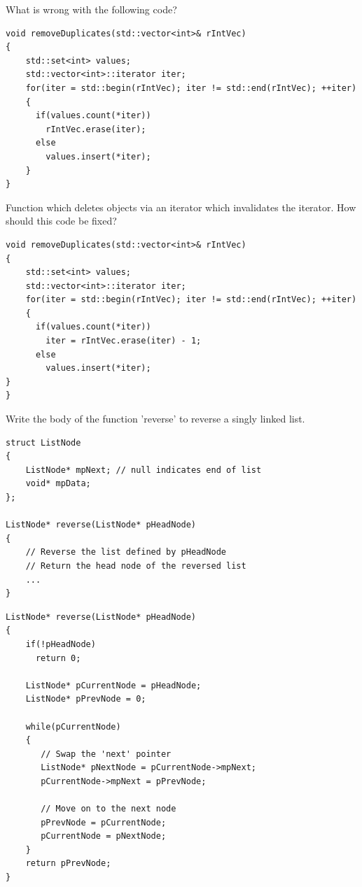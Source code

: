 \documentclass{exam}%
\begin{document}
\begin{questions}
\question What is wrong with the following code?
\begin{lstlisting}
void removeDuplicates(std::vector<int>& rIntVec)
{
    std::set<int> values;
    std::vector<int>::iterator iter;
    for(iter = std::begin(rIntVec); iter != std::end(rIntVec); ++iter)
    {
      if(values.count(*iter))
        rIntVec.erase(iter);
      else
        values.insert(*iter);
    }
}
\end{lstlisting}
\begin{solution}[.2in]
Function which deletes objects via an iterator which invalidates the iterator. How should this code be fixed?
\begin{lstlisting}
void removeDuplicates(std::vector<int>& rIntVec)
{
    std::set<int> values;
    std::vector<int>::iterator iter;
    for(iter = std::begin(rIntVec); iter != std::end(rIntVec); ++iter)
    {
      if(values.count(*iter))
        iter = rIntVec.erase(iter) - 1;
      else
        values.insert(*iter);
}
}
\end{lstlisting}
\end{solution}

\question Write the body of the function 'reverse' to reverse a singly linked list.
\begin{lstlisting}
struct ListNode
{
    ListNode* mpNext; // null indicates end of list
    void* mpData;
};

ListNode* reverse(ListNode* pHeadNode)
{
    // Reverse the list defined by pHeadNode
    // Return the head node of the reversed list
    ...
}
\end{lstlisting}
\begin{solution}[.2in]
\begin{lstlisting}
ListNode* reverse(ListNode* pHeadNode)
{
    if(!pHeadNode)
      return 0;

    ListNode* pCurrentNode = pHeadNode;
    ListNode* pPrevNode = 0;

    while(pCurrentNode)
    {
       // Swap the 'next' pointer
       ListNode* pNextNode = pCurrentNode->mpNext;
       pCurrentNode->mpNext = pPrevNode;

       // Move on to the next node
       pPrevNode = pCurrentNode;
       pCurrentNode = pNextNode;
    }
    return pPrevNode;
}
\end{lstlisting}
\end{solution}


\end{questions}
\end{document}
